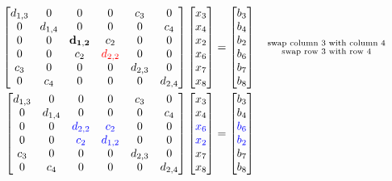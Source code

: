 \documentclass{article}
\begin{document}
\begin{align*}
    \begin{bmatrix}
         d_{1,3} & 0 & 0 &0 & c_{3} & 0\\
        0 & d_{1,4} & 0 & 0 & 0 & c_{4} \\
          0 & 0 & \mathbf{d_{1,2}} & c_{2} & 0 & 0 \\
        0 & 0& c_{2} & \color{red}d_{2,2}\color{black} & 0 & 0 \\
        c_{3} & 0 & 0 & 0 & d_{2,3} & 0 \\
        0 &c_{4} & 0 & 0 & 0 & d_{2,4}
    \end{bmatrix}\begin{bmatrix}
         x_{3} \\ x_{4} \\ x_{2} \\ x_{6} \\ x_{7} \\ x_{8}
    \end{bmatrix} = \begin{bmatrix}
        b_{3} \\ b_{4} \\ b_{2} \\ b_{6} \\ b_{7} \\ b_{8}
    \end{bmatrix} \quad \substack{\text{swap column $3$ with column $4$} \\
                                  \text{swap row $3$ with row $4$}} \\
    \begin{bmatrix}
         d_{1,3} & 0 & 0 &0 & c_{3} & 0\\
        0 & d_{1,4} & 0 & 0 & 0 & c_{4} \\
        0 & 0& \color{blue}d_{2,2}\color{black} & \color{blue}c_{2}\color{black}& 0 & 0 \\
        0 & 0 & \color{blue}c_{2}\color{black}& \color{blue}d_{1,2}\color{black} & 0 & 0 \\
        c_{3} & 0 & 0 & 0 & d_{2,3} & 0 \\
        0 &c_{4} & 0 & 0 & 0 & d_{2,4}
    \end{bmatrix}\begin{bmatrix}
         x_{3} \\ x_{4} \\ \color{blue}x_{6}\color{black} \\ \color{blue}x_{2}\color{black} \\ x_{7} \\ x_{8}
    \end{bmatrix} = \begin{bmatrix}
        b_{3} \\ b_{4} \\ \color{blue}b_{6}\color{black} \\ \color{blue}b_{2}\color{black} \\ b_{7} \\ b_{8}
    \end{bmatrix} \quad \phantom{\substack{\text{swap column $3$ with column $4$} \\
                                  \text{swap row $3$ with row $4$}}}
\end{align*}
\end{document}
